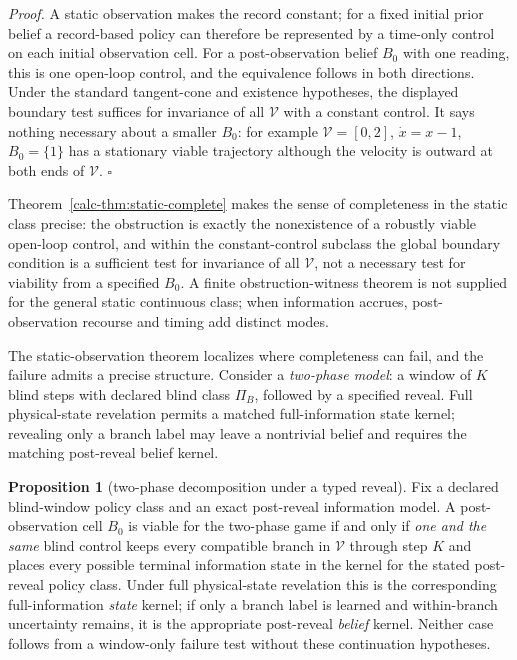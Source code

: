\documentclass[10pt,twocolumn]{article}
\theoremstyle{definition}
\newtheorem{proposition}{Proposition}
\begin{document}
\emph{Proof.} A static observation makes the record constant;
for a fixed initial prior belief a record-based policy can therefore be
represented by a time-only control on each initial observation cell.
For a post-observation belief \(B_0\) with one reading, this is one
open-loop control, and the equivalence follows in both directions.
Under the standard tangent-cone and existence hypotheses, the displayed
boundary test suffices for invariance of all \(\mathcal V\) with a
constant control. It says nothing necessary about a smaller \(B_0\):
for example \(\mathcal V=[0,2]\), \(\dot x=x-1\),
\(B_0=\{1\}\) has a stationary viable trajectory although the
velocity is outward at both ends of \(\mathcal V\). \hfill\(\square\)

Theorem~\ref{calc-thm:static-complete} makes the sense of completeness in the static class precise: the obstruction is exactly the nonexistence of a robustly viable open-loop control, and within the constant-control subclass the global boundary condition is a sufficient test for invariance of all \(\mathcal V\), not a necessary test for viability from a specified \(B_0\). A finite obstruction-witness theorem is not supplied for the general static continuous class; when information accrues, post-observation recourse and timing add distinct modes.

\medskip
The static-observation theorem localizes where completeness can fail, and the failure
admits a precise structure. Consider a \emph{two-phase model}: a window of \(K\) blind steps with declared blind class \(\Pi_B\), followed by a specified reveal. Full physical-state revelation permits a matched full-information state kernel; revealing only a branch label may leave a nontrivial belief and requires the matching post-reveal belief kernel.

\begin{proposition}[two-phase decomposition under a typed reveal]\label{calc-prop:decomposition}
Fix a declared blind-window policy class and an exact post-reveal information model. A post-observation cell \(B_0\) is viable for the two-phase game if and only if \emph{one and the same} blind control keeps every compatible branch in \(\mathcal V\) through step \(K\) and places every possible terminal information state in the kernel for the stated post-reveal policy class. Under full physical-state revelation this is the corresponding full-information \emph{state} kernel; if only a branch label is learned and within-branch uncertainty remains, it is the appropriate post-reveal \emph{belief} kernel. Neither case follows from a window-only failure test without these continuation hypotheses.
\end{proposition}
\end{document}
